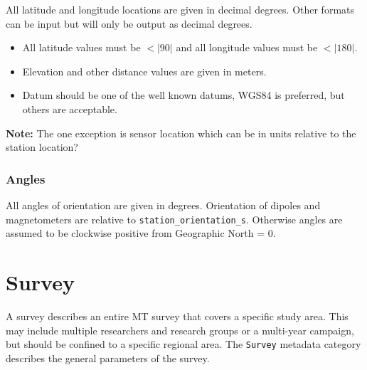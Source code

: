 \documentclass{article}
\begin{document}
All latitude and longitude locations are given in decimal degrees. Other formats can be input but will only be output as decimal degrees.

\begin{itemize}
	\setlength\itemsep{0em}
	\item All latitude values must be $<|90|$ and all longitude values must be $<|180|$.
	\item Elevation and other distance values are given in meters.
	\item Datum should be one of the well known datums, WGS84 is preferred, but others are acceptable.
\end{itemize} 

\textbf{Note:} The one exception is sensor location which can be in units relative to the station location?  

\subsubsection{Angles}

All angles of orientation are given in degrees.  Orientation of dipoles and magnetometers are relative to \verb|station_orientation_s|.  Otherwise angles are assumed to be clockwise positive from Geographic North = 0.  

\newpage
\section{Survey}

A survey describes an entire MT survey that covers a specific study area.  This may include multiple researchers and research groups or a multi-year campaign, but should be confined to a specific regional area.  The \verb|Survey| metadata category describes the general parameters of the survey. 
\end{document}
